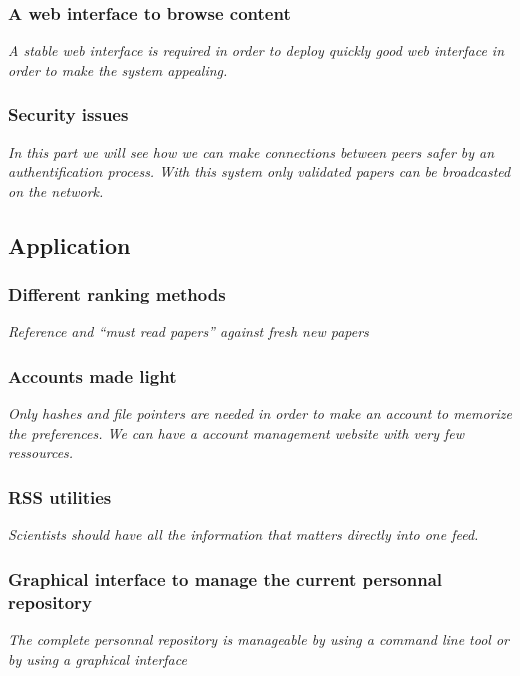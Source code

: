 \subsubsection{A web interface to browse content}

\textit{A stable web interface is required in order to
deploy quickly good web interface in order to make the system
appealing.}

\subsubsection{Security issues}

\textit{In this part we will see how we can make connections
between peers safer by an authentification process. With this
system only validated papers can be broadcasted on the network.}

\subsection{Application}

\subsubsection{Different ranking methods}

\textit{Reference and ``must read papers'' against fresh new papers}

\subsubsection{Accounts made light}

\textit{Only hashes and file pointers are needed in order to make an
account to memorize the preferences. We can have a account management
website with very few ressources.}

\subsubsection{RSS utilities}

\textit{Scientists should have all the information that matters directly into
one feed.}

\subsubsection{Graphical interface to manage the current personnal repository}

\textit{The complete personnal repository is manageable by using a command line
tool or by using a graphical interface}

